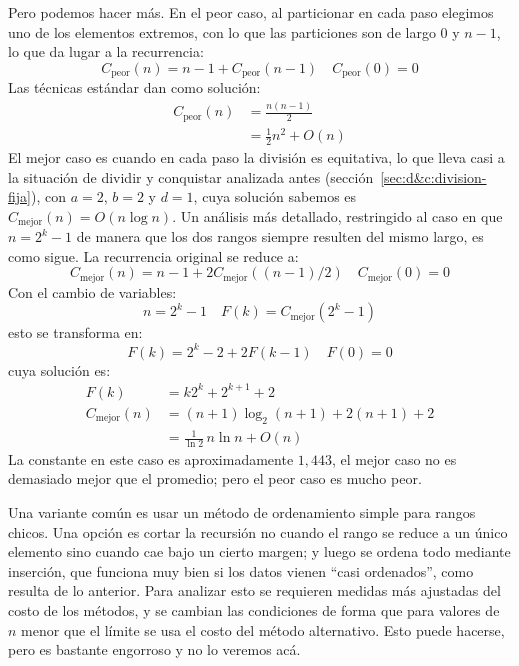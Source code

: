   Pero podemos hacer más.
  En el peor caso,%
  al particionar en cada paso elegimos uno de los elementos extremos,
  con lo que las particiones son de largo 0 y \(n - 1\),
  lo que da lugar a la recurrencia:
  \begin{equation*}
    C_{\text{peor}}(n)
      = n - 1 + C_{\text{peor}}(n - 1) \quad C_{\text{peor}}(0) = 0
  \end{equation*}
  Las técnicas estándar dan como solución:
  \begin{align*}
    C_{\text{peor}}(n)
      &= \frac{n (n - 1)}{2} \\
      &= \frac{1}{2} n^2 + O(n)
  \end{align*}
  El mejor caso es cuando en cada paso la división es equitativa,
  lo que lleva casi a la situación de dividir y conquistar
  analizada antes
  (sección~\ref{sec:d&c:division-fija}),
  con \(a = 2\), \(b = 2\) y \(d = 1\),
  cuya solución sabemos es \(C_{\text{mejor}}(n) = O(n \log n)\).
  Un análisis más detallado,
  restringido al caso en que \(n = 2^k - 1\)
  de manera que los dos rangos siempre resulten del mismo largo,
  es como sigue.%
  La recurrencia original se reduce a:
  \begin{equation*}
    C_{\text{mejor}}(n)
      = n - 1 + 2 C_{\text{mejor}}((n - 1) / 2)
      \quad C_{\text{mejor}}(0) = 0
  \end{equation*}
  Con el cambio de variables:
  \begin{equation*}
    n = 2^k - 1 \quad F(k) = C_{\text{mejor}}(2^k - 1)
  \end{equation*}
  esto se transforma en:
  \begin{equation*}
    F(k)
      = 2^k - 2 + 2 F(k - 1) \quad F(0) = 0
  \end{equation*}
  cuya solución es:
  \begin{align*}
    F(k)
      &= k 2^k + 2^{k + 1} + 2 \\
    C_{\text{mejor}}(n)
      &= (n + 1) \log_2 (n + 1) + 2 (n + 1) + 2 \\
      &= \frac{1}{\ln 2} \, n \ln n + O(n)
  \end{align*}
  La constante en este caso es aproximadamente \(1,443\),
  el mejor caso no es demasiado mejor que el promedio;
  pero el peor caso es mucho peor.

  Una variante común
  es usar un método de ordenamiento simple para rangos chicos.
  Una opción es cortar la recursión
  no cuando el rango se reduce a un único elemento
  sino cuando cae bajo un cierto margen;
  y luego se ordena todo mediante inserción,
  que funciona muy bien si los datos vienen ``casi ordenados'',
  como resulta de lo anterior.
  Para analizar esto se requieren medidas más ajustadas
  del costo de los métodos,
  y se cambian las condiciones de forma que para valores de \(n\)
  menor que el límite se usa el costo del método alternativo.
  Esto puede hacerse,
  pero es bastante engorroso y no lo veremos acá.

